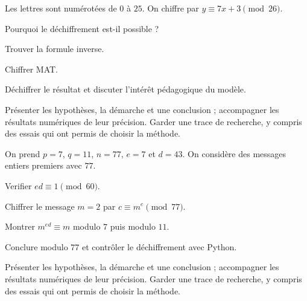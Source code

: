 \label{projet-3}
Les lettres sont numérotées de $0$ à $25$. On chiffre par $y\equiv7x+3\pmod{26}$.
\begin{questions}
\item Pourquoi le déchiffrement est-il possible ?
\item Trouver la formule inverse.
\item Chiffrer MAT.
\item Déchiffrer le résultat et discuter l’intérêt pédagogique du modèle.
\end{questions}
\vspace{5mm}\noindent Présenter les hypothèses, la démarche et une conclusion ; accompagner les résultats numériques de leur précision. Garder une trace de recherche, y compris des essais qui ont permis de choisir la méthode.\par\vfill{}\par\vspace{2mm}\noindent{}
\label{projet-4}
On prend $p=7$, $q=11$, $n=77$, $e=7$ et $d=43$. On considère des messages entiers premiers avec $77$.
\begin{questions}
\item Verifier $ed\equiv1\pmod{60}$.
\item Chiffrer le message $m=2$ par $c\equiv m^e\pmod{77}$.
\item Montrer $m^{ed}\equiv m$ modulo $7$ puis modulo $11$.
\item Conclure modulo $77$ et contrôler le déchiffrement avec Python.
\end{questions}
\vspace{5mm}\noindent Présenter les hypothèses, la démarche et une conclusion ; accompagner les résultats numériques de leur précision. Garder une trace de recherche, y compris des essais qui ont permis de choisir la méthode.\par\vfill{}\par\vspace{2mm}\noindent{}
